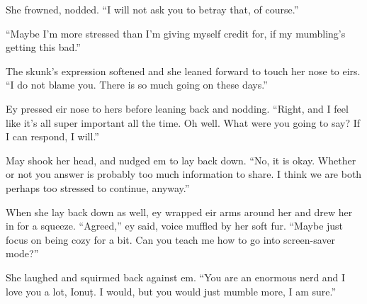 She frowned, nodded. ``I will not ask you to betray that, of course.''

``Maybe I'm more stressed than I'm giving myself credit for, if my mumbling's getting this bad.''

The skunk's expression softened and she leaned forward to touch her nose to eirs. ``I do not blame you. There is so much going on these days.''

Ey pressed eir nose to hers before leaning back and nodding. ``Right, and I feel like it's all super important all the time. Oh well. What were you going to say? If I can respond, I will.''

May shook her head, and nudged em to lay back down. ``No, it is okay. Whether or not you answer is probably too much information to share. I think we are both perhaps too stressed to continue, anyway.''

When she lay back down as well, ey wrapped eir arms around her and drew her in for a squeeze. ``Agreed,'' ey said, voice muffled by her soft fur. ``Maybe just focus on being cozy for a bit. Can you teach me how to go into screen-saver mode?''

She laughed and squirmed back against em. ``You are an enormous nerd and I love you a lot, Ionuț. I would, but you would just mumble more, I am sure.''
